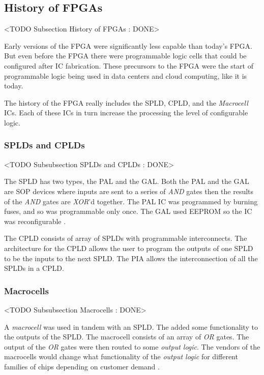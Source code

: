 \subsection{History of FPGAs}
	<TODO Subsection History of FPGAs : DONE>

Early versions of the \ac{FPGA} were significantly less capable than today's \ac{FPGA}. But even before the \ac{FPGA} there were programmable logic cells that could be configured after \ac{IC} fabrication. These precursors to the \ac{FPGA} were the start of programmable logic being used in data centers and cloud computing, like it is today.

The history of the \ac{FPGA} really includes the \ac{SPLD}, \ac{CPLD}, and the \emph{Macrocell} \ac{IC}s. Each of these \ac{IC}s in turn increase the processing the level of configurable logic.
	
\subsubsection{SPLDs and CPLDs}
	<TODO Subsubsection  SPLDs and CPLDs : DONE>

The \ac{SPLD} has two types, the \ac{PAL} and the \ac{GAL}. Both the \ac{PAL} and the \ac{GAL} are \ac{SOP} devices where inputs are sent to a series of \emph{AND} gates then the results of the \emph{AND} gates are \emph{XOR}'d together. The \ac{PAL} \ac{IC} was programmed by burning fuses, and so was programmable only once. The \ac{GAL} used \ac{EEPROM} so the \ac{IC} was reconfigurable \cite{floyd2011digital}.

The \ac{CPLD} consists of array of \ac{SPLD}s with programmable interconnects. The architecture for the \ac{CPLD} allows the user to program the outputs of one \ac{SPLD} to be the inputs to the next \ac{SPLD}. The \ac{PIA} allows the interconnection of all the \ac{SPLD}s in a \ac{CPLD}.
	
\subsubsection{Macrocells}
	<TODO Subsubsection  Macrocells : DONE>

A \emph{macrocell} was used in tandem with an \ac{SPLD}. The  added some functionality to the outputs of the \ac{SPLD}. The macrocell consists of an array of \emph{OR} gates. The output of the \emph{OR} gates were then routed to some \emph{output logic}. The vendors of the macrocells would change what functionality of the \emph{output logic} for different families of chips depending on customer demand \cite{floyd2011digital}.
	
